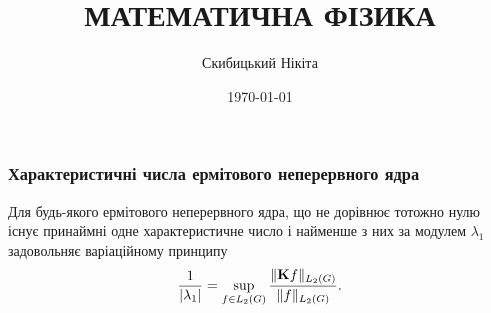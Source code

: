 

\title{{\Huge МАТЕМАТИЧНА ФІЗИКА}}
\author{Скибицький Нікіта}
\date{\today}





\tableofcontents

\setcounter{section}{2}
\setcounter{subsection}{3}
\setcounter{subsubsection}{0}
\setcounter{theorem}{14}
\setcounter{equation}{4}

\subsubsection{Характеристичні числа ермітового неперервного ядра}

\begin{theorem}
	Для будь-якого ермітового неперервного ядра, що не дорівнює тотожно нулю існує принаймні одне характеристичне число і найменше з них за модулем $\lambda_1$ задовольняє варіаційному принципу
	\begin{equation}
		\dfrac{1}{|\lambda_1|} = \displaystyle\sup\limits_{f \in L_2(G)} \dfrac{\|\textbf{K} f\|_{L_2(G)}}{\|f\|_{L_2(G)}}.
	\end{equation}
\end{theorem}

